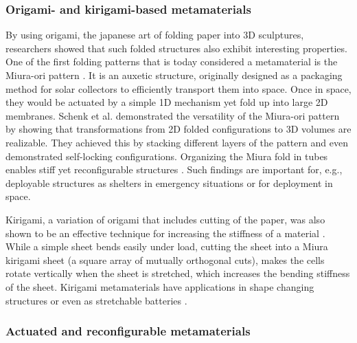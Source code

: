 {%


\subsubsection{Origami- and kirigami-based metamaterials}

By using origami, the japanese art of folding paper into 3D sculptures, researchers showed that such folded structures also exhibit interesting properties. One of the first folding patterns that is today considered a metamaterial is the Miura-ori pattern \cite{Miura1985}. It is an auxetic structure, originally designed as a packaging method for solar collectors to efficiently transport them into space. Once in space, they would be actuated by a simple 1D mechanism yet fold up into large 2D membranes. Schenk et al. \cite{Schenk2013} demonstrated the versatility of the Miura-ori pattern by showing that transformations from 2D folded configurations to 3D volumes are realizable. They achieved this by stacking different layers of the pattern and even demonstrated self-locking configurations. Organizing the Miura fold in tubes enables stiff yet reconfigurable structures \cite{Filipov2015}. Such findings are important for, e.g., deployable structures as shelters in emergency situations or for deployment in space. 

Kirigami, a variation of origami that includes cutting of the paper, was also shown to be an effective technique for increasing the stiffness of a material \cite{Rafsanjani2017}. While a simple sheet bends easily under load, cutting the sheet into a Miura kirigami sheet (a square array of mutually orthogonal cuts), makes the cells rotate vertically when the sheet is stretched, which increases the bending stiffness of the sheet. Kirigami metamaterials have applications in shape changing structures \cite{Neville2016} or even as stretchable batteries \cite{Song2015}.



\subsubsection{Actuated and reconfigurable metamaterials}

}
